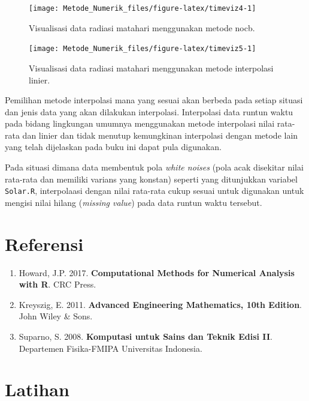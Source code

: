 \documentclass[
]{book}
\providecommand{\tightlist}{%
  \setlength{\itemsep}{0pt}\setlength{\parskip}{0pt}}
\theoremstyle{definition}
\theoremstyle{definition}
\theoremstyle{definition}
\theoremstyle{definition}
\theoremstyle{remark}
\begin{document}
\begin{figure}

{\centering \texttt{[image: Metode\_Numerik\_files/figure-latex/timeviz4-1]} 

}

\caption{Visualisasi data radiasi matahari menggunakan metode nocb.}\label{fig:timeviz4}
\end{figure}

\begin{figure}

{\centering \texttt{[image: Metode\_Numerik\_files/figure-latex/timeviz5-1]} 

}

\caption{Visualisasi data radiasi matahari menggunakan metode interpolasi linier.}\label{fig:timeviz5}
\end{figure}

Pemilihan metode interpolasi mana yang sesuai akan berbeda pada setiap situasi dan jenis data yang akan dilakukan interpolasi. Interpolasi data runtun waktu pada bidang lingkungan umumnya menggunakan metode interpolasi nilai rata-rata dan linier dan tidak menutup kemungkinan interpolasi dengan metode lain yang telah dijelaskan pada buku ini dapat pula digunakan.

Pada situasi dimana data membentuk pola \emph{white noises} (pola acak disekitar nilai rata-rata dan memiliki varians yang konstan) seperti yang ditunjukkan variabel \texttt{Solar.R}, interpolaasi dengan nilai rata-rata cukup sesuai untuk digunakan untuk mengisi nilai hilang (\emph{missing value}) pada data runtun waktu tersebut.

\hypertarget{referensi-7}{%
\section{Referensi}\label{referensi-7}}

\begin{enumerate}
\def\labelenumi{\arabic{enumi}.}
\tightlist
\item
  Howard, J.P. 2017. \textbf{Computational Methods for Numerical Analysis with R}. CRC Press.
\item
  Kreyszig, E. 2011. \textbf{Advanced Engineering Mathematics, 10th Edition}. John Wiley \& Sons.
\item
  Suparno, S. 2008. \textbf{Komputasi untuk Sains dan Teknik Edisi II}. Departemen Fisika-FMIPA Universitas Indonesia.
\end{enumerate}

\hypertarget{latihan-2}{%
\section{Latihan}\label{latihan-2}}
\end{document}
